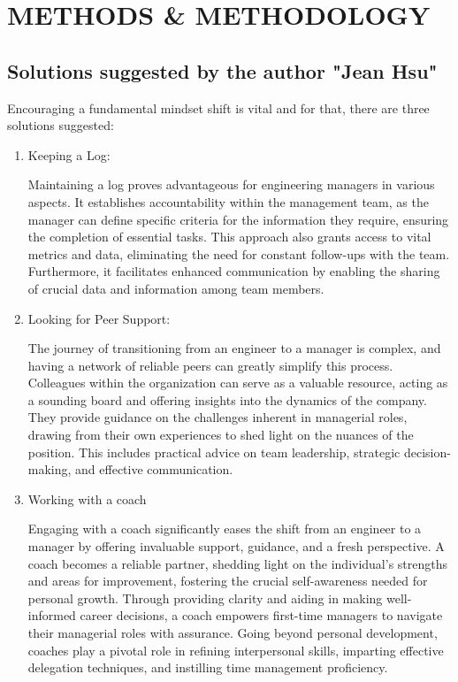 \documentclass[runningheads]{article}
\begin{document}
\section{METHODS \& METHODOLOGY}

\subsection{Solutions suggested by the author "Jean Hsu"}
Encouraging a fundamental mindset shift is vital and for that, there are three solutions suggested:
\begin{enumerate}
    \item Keeping a Log: 

    Maintaining a log proves advantageous for engineering managers in various aspects. It establishes accountability within the management team, as the manager can define specific criteria for the information they require, ensuring the completion of essential tasks. This approach also grants access to vital metrics and data, eliminating the need for constant follow-ups with the team. Furthermore, it facilitates enhanced communication by enabling the sharing of crucial data and information among team members. \\

    \item Looking for Peer Support: 

    The journey of transitioning from an engineer to a manager is complex, and having a network of reliable peers can greatly simplify this process. Colleagues within the organization can serve as a valuable resource, acting as a sounding board and offering insights into the dynamics of the company. They provide guidance on the challenges inherent in managerial roles, drawing from their own experiences to shed light on the nuances of the position. This includes practical advice on team leadership, strategic decision-making, and effective communication. \\

    \item Working with a coach 

    Engaging with a coach significantly eases the shift from an engineer to a manager by offering invaluable support, guidance, and a fresh perspective. A coach becomes a reliable partner, shedding light on the individual's strengths and areas for improvement, fostering the crucial self-awareness needed for personal growth. Through providing clarity and aiding in making well-informed career decisions, a coach empowers first-time managers to navigate their managerial roles with assurance. Going beyond personal development, coaches play a pivotal role in refining interpersonal skills, imparting effective delegation techniques, and instilling time management proficiency. \\
    
\end{enumerate}
\end{document}
